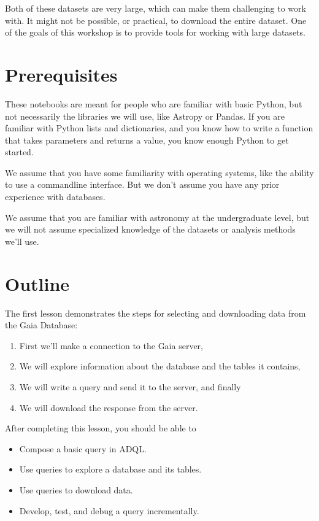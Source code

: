 \documentclass[letterpaper,10pt,english]{sphinxmanual}
\begin{document}
Both of these datasets are very large, which can make them challenging to work with.  It might not be possible, or practical, to download the entire dataset.
One of the goals of this workshop is to provide tools for working with large datasets.


\section{Prerequisites}
\label{\detokenize{01_query:prerequisites}}
These notebooks are meant for people who are familiar with basic Python, but not necessarily the libraries we will use, like Astropy or Pandas.  If you are familiar with Python lists and dictionaries, and you know how to write a function that takes parameters and returns a value, you know enough Python to get started.

We assume that you have some familiarity with operating systems, like the ability to use a command\sphinxhyphen{}line interface.  But we don’t assume you have any prior experience with databases.

We assume that you are familiar with astronomy at the undergraduate level, but we will not assume specialized knowledge of the datasets or analysis methods we’ll use.


\section{Outline}
\label{\detokenize{01_query:outline}}
The first lesson demonstrates the steps for selecting and downloading data from the Gaia Database:
\begin{enumerate}
%
\item {} 
First we’ll make a connection to the Gaia server,

\item {} 
We will explore information about the database and the tables it contains,

\item {} 
We will write a query and send it to the server, and finally

\item {} 
We will download the response from the server.

\end{enumerate}

After completing this lesson, you should be able to
\begin{itemize}
\item {} 
Compose a basic query in ADQL.

\item {} 
Use queries to explore a database and its tables.

\item {} 
Use queries to download data.

\item {} 
Develop, test, and debug a query incrementally.

\end{itemize}
\end{document}
